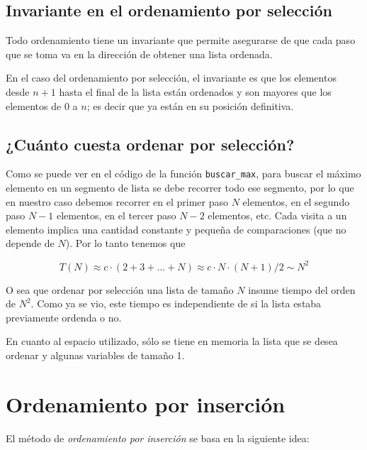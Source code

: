 \subsection{Invariante en el ordenamiento por selección}

Todo ordenamiento tiene un invariante que permite asegurarse de que cada
paso que se toma va en la dirección de obtener una lista ordenada.

En el caso del ordenamiento por selección, el invariante es que los
elementos desde $n + 1$ hasta el final de la lista están ordenados y
son mayores que los elementos de $0$ a $n$; es decir
que ya están en su posición definitiva.

\subsection{¿Cuánto cuesta ordenar por selección?}

Como se puede ver en el código de la función \lstinline!buscar_max!, para
buscar el máximo elemento en un segmento de lista se debe recorrer todo ese
segmento, por lo que en nuestro caso debemos recorrer en el primer paso $N$
elementos, en el segundo paso $N-1$ elementos, en el tercer paso $N-2$
elementos, etc. Cada visita a un elemento implica una cantidad constante y
pequeña de comparaciones (que no depende de $N$). Por lo tanto tenemos que

$$ T(N) \approx c \cdot (2 + 3 + \ldots + N) \approx c \cdot N \cdot (N+1)/2 \sim N^2 $$

O sea que ordenar por selección una lista de tamaño $N$ insume tiempo del
orden de $N^2$.  Como ya se vio, este tiempo es independiente de si la
lista estaba previamente ordenda o no.

En cuanto al espacio utilizado, sólo se tiene en memoria la
lista que se desea ordenar y algunas variables de tamaño 1.

\section{Ordenamiento por inserción}

El método de {\it ordenamiento por inserción} se basa en la siguiente idea:

